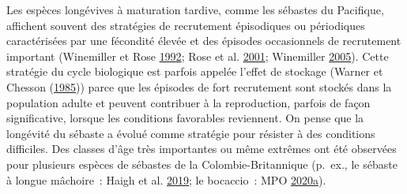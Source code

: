 \documentclass[french,11pt]{book}
\begin{document}
Les espèces longévives à maturation tardive, comme les sébastes du Pacifique, affichent souvent des stratégies de recrutement épisodiques ou périodiques caractérisées par une fécondité élevée et des épisodes occasionnels de recrutement important (Winemiller et Rose \protect\hyperlink{ref-winemiller1992}{1992}; Rose et al. \protect\hyperlink{ref-rose2001}{2001}; Winemiller \protect\hyperlink{ref-winemiller2005}{2005}). Cette stratégie du cycle biologique est parfois appelée l'effet de stockage (Warner et Chesson (\protect\hyperlink{ref-warner1985}{1985})) parce que les épisodes de fort recrutement sont stockés dans la population adulte et peuvent contribuer à la reproduction, parfois de façon significative, lorsque les conditions favorables reviennent. On pense que la longévité du sébaste a évolué comme stratégie pour résister à des conditions difficiles. Des classes d'âge très importantes ou même extrêmes ont été observées pour plusieurs espèces de sébastes de la Colombie-Britannique (p.~ex., le sébaste à longue mâchoire~: Haigh et al. \protect\hyperlink{ref-haigh2019}{2019}; le bocaccio~: MPO \protect\hyperlink{ref-haigh2020}{2020}\protect\hyperlink{ref-haigh2020}{a}).
\end{document}
